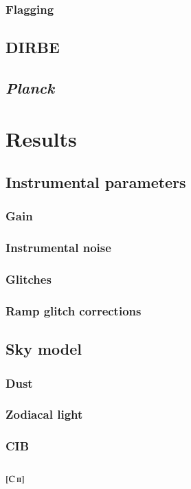 \documentclass{aa}
\def\Planck{\textit{Planck}}
\newcommand{\CII}{\ensuremath{\textsc{[C\,ii]}}}
\begin{document}
\subsubsection{Flagging}

\subsection{DIRBE}

\subsection{\Planck}

\section{Results}
\subsection{Instrumental parameters}
\subsubsection{Gain}
\subsubsection{Instrumental noise}
\subsubsection{Glitches}
\subsubsection{Ramp glitch corrections}
\subsection{Sky model}
\subsubsection{Dust}
\subsubsection{Zodiacal light}
\subsubsection{CIB}
\subsubsection{\CII}
\end{document}
